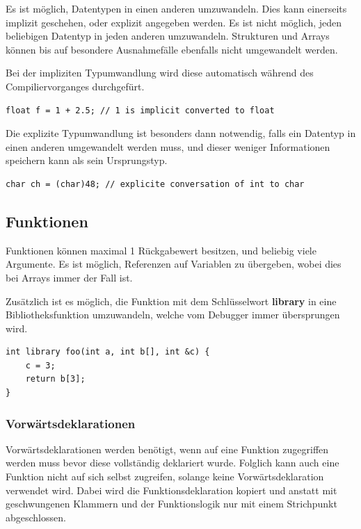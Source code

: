 Es ist m\"oglich, Datentypen in einen anderen umzuwandeln. Dies kann einerseits implizit geschehen, oder explizit angegeben werden. Es ist nicht m\"oglich, jeden beliebigen Datentyp in jeden anderen umzuwandeln. Strukturen und Arrays können bis auf besondere Ausnahmef\"alle ebenfalls nicht umgewandelt werden.


Bei der impliziten Typumwandlung wird diese automatisch w\"ahrend des Compiliervorganges durchgef\"urt.

\begin{lstlisting}[language=CMM]
float f = 1 + 2.5; // 1 is implicit converted to float
\end{lstlisting}


Die explizite Typumwandlung ist besonders dann notwendig, falls ein Datentyp in einen anderen umgewandelt werden muss, und dieser weniger Informationen speichern kann als sein Ursprungstyp.

\begin{lstlisting}[language=CMM]
char ch = (char)48; // explicite conversation of int to char
\end{lstlisting}

\subsection{Funktionen}

Funktionen k\"onnen maximal 1 R\"uckgabewert besitzen, und beliebig viele Argumente. Es ist m\"oglich, Referenzen auf Variablen zu \"ubergeben, wobei dies bei Arrays immer der Fall ist.

Zus\"atzlich ist es m\"oglich, die Funktion mit dem Schl\"usselwort \textbf{library} in eine Bibliotheksfunktion umzuwandeln, welche vom Debugger immer \"ubersprungen wird.

\begin{lstlisting}[language=CMM]
int library foo(int a, int b[], int &c) {
	c = 3;
	return b[3];
}
\end{lstlisting}

\subsubsection{Vorw\"artsdeklarationen}

Vorw\"artsdeklarationen werden ben\"otigt, wenn auf eine Funktion zugegriffen werden muss bevor diese vollst\"andig deklariert wurde. Folglich kann auch eine Funktion nicht auf sich selbst zugreifen, solange keine Vorw\"artsdeklaration verwendet wird. Dabei wird die Funktionsdeklaration kopiert und anstatt mit geschwungenen Klammern und der Funktionslogik nur mit einem Strichpunkt abgeschlossen.

